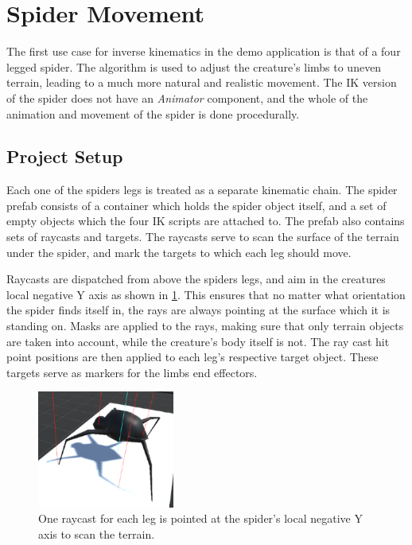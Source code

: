 \section{Spider Movement}
The first use case for inverse kinematics in the demo application is that of
a four legged spider. The algorithm is used to adjust the creature's limbs to
uneven terrain, leading to a much more natural and realistic movement. The IK
version of the spider does not have an \textit{Animator} component, and the whole of the
animation and movement of the spider is done procedurally.
\subsection{Project Setup}
Each one of the spiders legs is treated as a separate kinematic chain. The
spider prefab consists of a container which holds the spider object itself, and
a set of empty objects which the four IK scripts are attached to. The prefab
also contains sets of raycasts and targets. The raycasts serve to scan the
surface of the terrain under the spider, and mark the targets to which each leg
should move.

Raycasts are dispatched from above the spiders legs, and aim in the creatures
local negative Y axis as shown in \ref{fig:ray_casts_intro}. This ensures that no matter what orientation the spider
finds itself in, the rays are always pointing at the surface which it is
standing on. Masks are applied to the rays, making sure that only terrain
objects are taken into account, while the creature's body itself is not. The ray
cast hit point positions are then applied to each leg's respective target
object. These targets serve as markers for the limbs end effectors. 

\begin{figure}
    \centering
    \includegraphics[width=0.4\textwidth]{grafika/sp_ik_flat.eps}
    \caption{One raycast for each leg is pointed at the spider's local negative
    Y axis to scan the terrain.}
    \label{fig:ray_casts_intro}
\end{figure}

